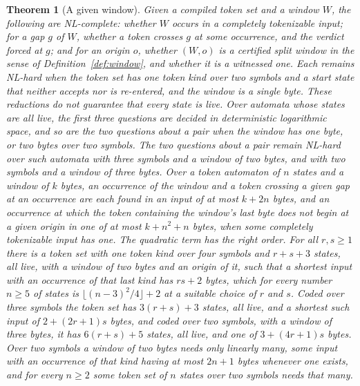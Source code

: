 \documentclass[11pt,a4paper]{article}
\theoremstyle{definition}
\theoremstyle{plain}
\newtheorem{theorem}{Theorem}
\begin{document}
\begin{theorem}[A given window]
\label{thm:fixed-nl}
Given a compiled token set and a window $W$, the following are NL-complete: whether $W$ occurs in a completely
tokenizable input; for a gap $g$ of $W$, whether a token crosses $g$ at some occurrence, and the verdict forced at $g$;
and for an origin $o$, whether $(W, o)$ is a certified split window in the sense of Definition~\ref{def:window}, and
whether it is a witnessed one. Each remains NL-hard when the token set has one token kind over two symbols and a start
state that neither accepts nor is re-entered, and the window is a single byte. These reductions do not guarantee that
every state is live. Over automata whose states are all live, the first three questions are decided in deterministic
logarithmic space, and so are the two questions about a pair when the window has one byte, or two bytes over two
symbols. The two questions about a pair remain NL-hard over such automata with three symbols and a window of two bytes,
and with two symbols and a window of three bytes. Over a token automaton of $n$ states and a window of $k$ bytes, an
occurrence of the window and a token crossing a given gap at an occurrence are each found in an input of at most
$k + 2n$ bytes, and an occurrence at which the token containing the window's last byte does not begin at a given origin
in one of at most $k + n^2 + n$ bytes, when some completely tokenizable input has one. The quadratic term has the right
order. For all $r, s \geq 1$ there is a token set with one token kind over four symbols and $r + s + 3$ states, all
live, with a window of two bytes and an origin of it, such that a shortest input with an occurrence of that last kind
has $r s + 2$ bytes, which for every number $n \geq 5$ of states is $\lfloor (n - 3)^2 / 4 \rfloor + 2$ at a suitable
choice of $r$ and $s$. Coded over three symbols the token set has $3 (r + s) + 3$ states, all live, and a shortest such
input of $2 + (2 r + 1) s$ bytes, and coded over two symbols, with a window of three bytes, it has $6 (r + s) + 5$
states, all live, and one of $3 + (4 r + 1) s$ bytes. Over two symbols a window of two bytes needs only linearly many,
some input with an occurrence of that kind having at most $2n + 1$ bytes whenever one exists, and for every $n \geq 2$
some token set of $n$ states over two symbols needs that many.
\end{theorem}
\end{document}
